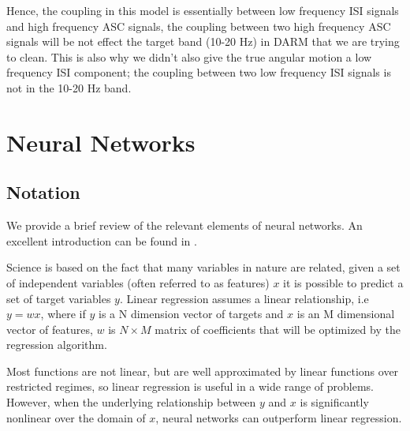 \begin{refsection}
Hence, the coupling in this model is essentially between low frequency ISI signals and high frequency ASC signals, the coupling between two high frequency ASC signals will be not effect the target band (10-20 Hz) in DARM that we are trying to clean. This is also why we didn't also give the true angular motion a low frequency ISI component; the coupling between two low frequency ISI signals is not in the 10-20 Hz band.




\section{Neural Networks}

\subsection{Notation}
We provide a brief review of the relevant elements of neural networks. An excellent introduction can be found in \cite{nielsen2015neural}.

Science is based on the fact that many variables in nature are related, given a set of independent variables (often referred to as features) $x$ it is possible to predict a set of target variables $y$. Linear regression assumes a linear relationship, i.e $y=wx$, where if $y$ is a N dimension vector of targets and $x$ is an M dimensional vector of features, $w$ is $N \times M$ matrix of coefficients that will be optimized by the regression algorithm.

Most functions are not linear, but are well approximated by linear functions over restricted regimes, so linear regression is useful in a wide range of problems. However, when the underlying relationship between $y$ and $x$ is significantly nonlinear over the domain of $x$, neural networks can outperform linear regression.


\end{refsection}
